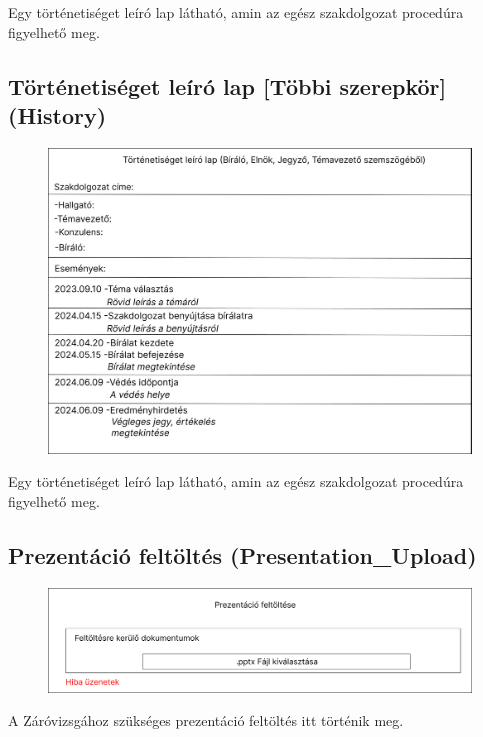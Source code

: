 \documentclass[a4paper,12pt]{article}
\begin{document}
Egy történetiséget leíró lap látható, amin az egész szakdolgozat procedúra figyelhető meg.

\subsection{Történetiséget leíró lap [Többi szerepkör] (History)}

\begin{figure}
	\centering
	\includegraphics[width=\textwidth]{images/Web_pages/History.jpg}
	\caption{}
	\label{fig:History}
\end{figure}

Egy történetiséget leíró lap látható, amin az egész szakdolgozat procedúra figyelhető meg.

\subsection{Prezentáció feltöltés (Presentation\_Upload)}

\begin{figure}
	\centering
	\includegraphics[width=\textwidth]{images/Web_pages/Presentation_Upload.jpg}
	\caption{}
	\label{fig:Presentation_Upload}
\end{figure}

A Záróvizsgához szükséges prezentáció feltöltés itt történik meg.
\end{document}
